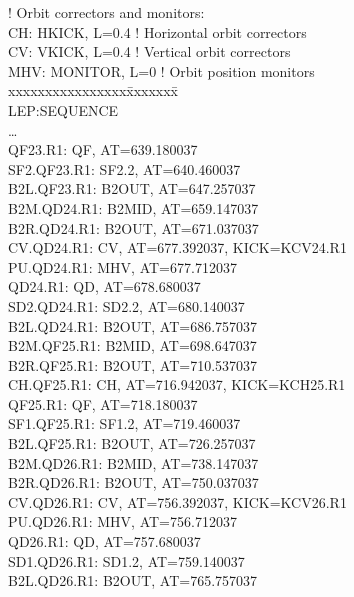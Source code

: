 {! Orbit correctors and monitors: \\
CH:    \>HKICK,     \>L=0.4       \>! Horizontal orbit correctors \\
CV:    \>VKICK,     \>L=0.4       \>! Vertical orbit correctors \\
MHV:   \>MONITOR,   \>L=0         \>! Orbit position monitors \\
 
xxxxxxxxxxxxxxxx\=xxxxxxx\=\kill \\
LEP:SEQUENCE \\
   \ldots \\
QF23.R1:        \>QF,    \>AT=639.180037 \\
   SF2.QF23.R1: \>SF2.2, \>AT=640.460037 \\
   B2L.QF23.R1: \>B2OUT, \>AT=647.257037 \\
   B2M.QD24.R1: \>B2MID, \>AT=659.147037 \\
   B2R.QD24.R1: \>B2OUT, \>AT=671.037037 \\
   CV.QD24.R1:  \>CV,    \>AT=677.392037, KICK=KCV24.R1 \\
   PU.QD24.R1:  \>MHV,   \>AT=677.712037 \\
QD24.R1:        \>QD,    \>AT=678.680037 \\
   SD2.QD24.R1: \>SD2.2, \>AT=680.140037 \\
   B2L.QD24.R1: \>B2OUT, \>AT=686.757037 \\
   B2M.QF25.R1: \>B2MID, \>AT=698.647037 \\
   B2R.QF25.R1: \>B2OUT, \>AT=710.537037 \\
   CH.QF25.R1:  \>CH,    \>AT=716.942037, KICK=KCH25.R1 \\
QF25.R1:        \>QF,    \>AT=718.180037 \\
   SF1.QF25.R1: \>SF1.2, \>AT=719.460037 \\
   B2L.QF25.R1: \>B2OUT, \>AT=726.257037 \\
   B2M.QD26.R1: \>B2MID, \>AT=738.147037 \\
   B2R.QD26.R1: \>B2OUT, \>AT=750.037037 \\
   CV.QD26.R1:  \>CV,    \>AT=756.392037, KICK=KCV26.R1 \\
   PU.QD26.R1:  \>MHV,   \>AT=756.712037 \\
QD26.R1:        \>QD,    \>AT=757.680037 \\
   SD1.QD26.R1: \>SD1.2, \>AT=759.140037 \\
   B2L.QD26.R1: \>B2OUT, \>AT=765.757037 \\
}
